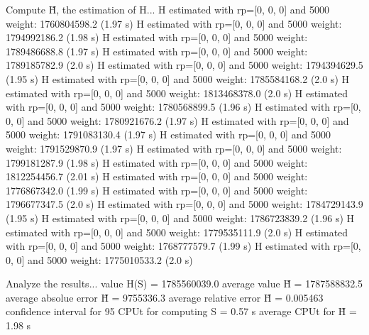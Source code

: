 Compute H̃, the estimation of H...
  H estimated with rp=[0, 0, 0] and 5000 weight:  1760804598.2  (1.97 s)
  H estimated with rp=[0, 0, 0] and 5000 weight:  1794992186.2  (1.98 s)
  H estimated with rp=[0, 0, 0] and 5000 weight:  1789486688.8  (1.97 s)
  H estimated with rp=[0, 0, 0] and 5000 weight:  1789185782.9  (2.0 s)
  H estimated with rp=[0, 0, 0] and 5000 weight:  1794394629.5  (1.95 s)
  H estimated with rp=[0, 0, 0] and 5000 weight:  1785584168.2  (2.0 s)
  H estimated with rp=[0, 0, 0] and 5000 weight:  1813468378.0  (2.0 s)
  H estimated with rp=[0, 0, 0] and 5000 weight:  1780568899.5  (1.96 s)
  H estimated with rp=[0, 0, 0] and 5000 weight:  1780921676.2  (1.97 s)
  H estimated with rp=[0, 0, 0] and 5000 weight:  1791083130.4  (1.97 s)
  H estimated with rp=[0, 0, 0] and 5000 weight:  1791529870.9  (1.97 s)
  H estimated with rp=[0, 0, 0] and 5000 weight:  1799181287.9  (1.98 s)
  H estimated with rp=[0, 0, 0] and 5000 weight:  1812254456.7  (2.01 s)
  H estimated with rp=[0, 0, 0] and 5000 weight:  1776867342.0  (1.99 s)
  H estimated with rp=[0, 0, 0] and 5000 weight:  1796677347.5  (2.0 s)
  H estimated with rp=[0, 0, 0] and 5000 weight:  1784729143.9  (1.95 s)
  H estimated with rp=[0, 0, 0] and 5000 weight:  1786723839.2  (1.96 s)
  H estimated with rp=[0, 0, 0] and 5000 weight:  1779535111.9  (2.0 s)
  H estimated with rp=[0, 0, 0] and 5000 weight:  1768777579.7  (1.99 s)
  H estimated with rp=[0, 0, 0] and 5000 weight:  1775010533.2  (2.0 s)

Analyze the results...
  value H(S)                  = 1785560039.0 
  average value H̃             = 1787588832.5 
  average absolue error H̃     = 9755336.3 
  average relative error H̃    = 0.005463 
  confidence interval for 95%
  CPUt for computing S         = 0.57 s
  average CPUt for H̃           = 1.98 s


